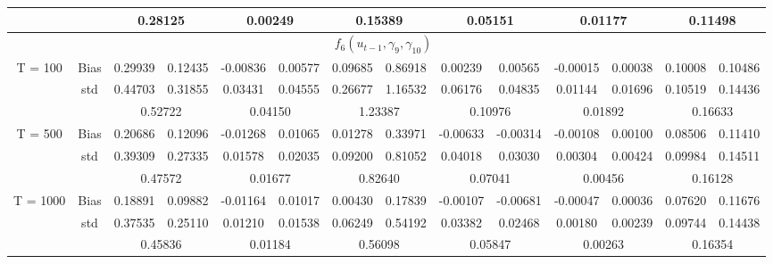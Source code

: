 \documentclass[a4paper,12pt,times,numbered,print,index]{report}
\numberwithin{equation}{section}
\begin{document}
\begin{table}[htbp]
\begin{adjustbox}{max width=\textwidth}
\begin{tabular}{cccccccccccccc}
          &       & \multicolumn{2}{c}{0.28125} & \multicolumn{2}{c}{0.00249} & \multicolumn{2}{c}{0.15389} & \multicolumn{2}{c}{0.05151} & \multicolumn{2}{c}{0.01177} & \multicolumn{2}{c}{0.11498} \\
    \midrule
    &       & \multicolumn{10}{c}{$f_6 (u_{t-1}, \gamma_9, \gamma_{10})$}                \\
    \midrule
    \multirow{3}[1]{*}{T = 100} & Bias  & 0.29939 & 0.12435 & -0.00836 & 0.00577 & 0.09685 & 0.86918 & 0.00239 & 0.00565 & -0.00015 & 0.00038 & 0.10008 & 0.10486 \\
          & std   & 0.44703 & 0.31855 & 0.03431 & 0.04555 & 0.26677 & 1.16532 & 0.06176 & 0.04835 & 0.01144 & 0.01696 & 0.10519 & 0.14436 \\
          &       & \multicolumn{2}{c}{0.52722} & \multicolumn{2}{c}{\textcolor[rgb]{ .329,  .51,  .208}{0.04150}} & \multicolumn{2}{c}{1.23387} & \multicolumn{2}{c}{0.10976} & \multicolumn{2}{c}{\textcolor[rgb]{ .329,  .51,  .208}{0.01892}} & \multicolumn{2}{c}{0.16633} \\
    \multirow{3}[0]{*}{T = 500} & Bias  & 0.20686 & 0.12096 & -0.01268 & 0.01065 & 0.01278 & 0.33971 & -0.00633 & -0.00314 & -0.00108 & 0.00100 & 0.08506 & 0.11410 \\
          & std   & 0.39309 & 0.27335 & 0.01578 & 0.02035 & 0.09200 & 0.81052 & 0.04018 & 0.03030 & 0.00304 & 0.00424 & 0.09984 & 0.14511 \\
          &       & \multicolumn{2}{c}{0.47572} & \multicolumn{2}{c}{\textcolor[rgb]{ .329,  .51,  .208}{0.01677}} & \multicolumn{2}{c}{0.82640} & \multicolumn{2}{c}{0.07041} & \multicolumn{2}{c}{\textcolor[rgb]{ .329,  .51,  .208}{0.00456}} & \multicolumn{2}{c}{0.16128} \\
    \multirow{3}[1]{*}{T = 1000} & Bias  & 0.18891 & 0.09882 & -0.01164 & 0.01017 & 0.00430 & 0.17839 & -0.00107 & -0.00681 & -0.00047 & 0.00036 & 0.07620 & 0.11676 \\
          & std   & 0.37535 & 0.25110 & 0.01210 & 0.01538 & 0.06249 & 0.54192 & 0.03382 & 0.02468 & 0.00180 & 0.00239 & 0.09744 & 0.14438 \\
          &       & \multicolumn{2}{c}{0.45836} & \multicolumn{2}{c}{\textcolor[rgb]{ .329,  .51,  .208}{0.01184}} & \multicolumn{2}{c}{0.56098} & \multicolumn{2}{c}{0.05847} & \multicolumn{2}{c}{\textcolor[rgb]{ .329,  .51,  .208}{0.00263}} & \multicolumn{2}{c}{0.16354} \\
    \bottomrule
    \bottomrule
    \end{tabular}%
    \end{adjustbox}
  \label{s_f56}%
\end{table}%
\end{document}
